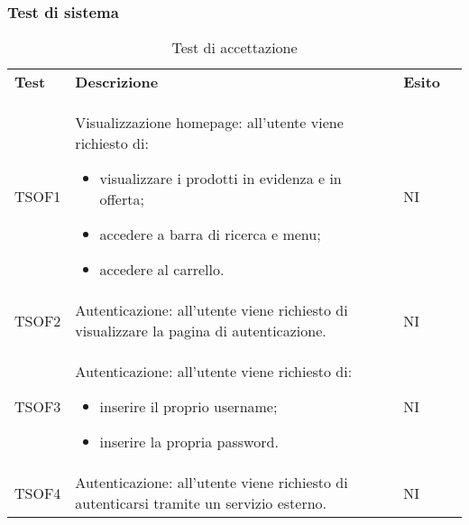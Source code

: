 \subsubsection{Test di sistema}
\begin{center}
    \centering
    \renewcommand{\arraystretch}{1.8}
    \label{tab:TestAccettazione}
    \begin{longtable}[!h]{p{50px} p{245px} p{75px} p{50px}}
        \caption{Test di accettazione}                                                                                                                                                                                          \\
        \rowcolor{logo!70} \textbf{Test} & \textbf{Descrizione}                                                                                                                                                & \textbf{Esito} \\
        TSOF1                            & Visualizzazione homepage: all'utente viene richiesto di: \begin{itemize} \item visualizzare i prodotti in evidenza e in offerta; \item accedere a barra di ricerca e menu; \item accedere al carrello. \end{itemize}                                                                                  & NI             \\
        TSOF2                            & Autenticazione: all'utente viene richiesto di visualizzare la pagina di autenticazione.                                                                              & NI             \\
        TSOF3                            & Autenticazione: all'utente viene richiesto di: \begin{itemize} \item inserire il proprio username; \item inserire la propria password. \end{itemize}                                                                                            & NI             \\
        TSOF4                            & Autenticazione: all'utente viene richiesto di autenticarsi tramite un servizio esterno.                                                                             & NI             \\

\end{longtable}
\end{center}

